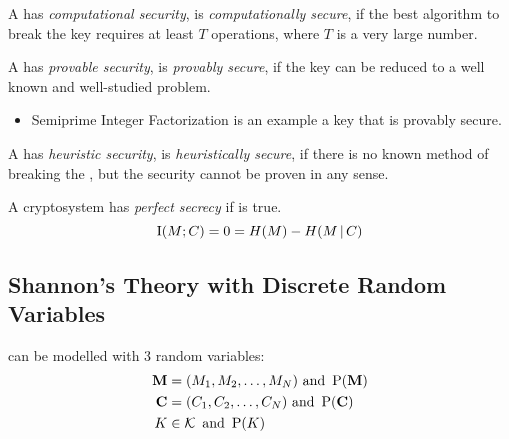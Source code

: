 \begin{definition}\label{def:Security-Computational}
  A  has \emph{computational security}, is \emph{computationally secure}, if the best algorithm to break the key requires at least $T$ operations, where $T$ is a very large number.
\end{definition}

\begin{definition}\label{def:Security-Provable}
  A  has \emph{provable security}, is \emph{provably secure}, if the key can be reduced to a well known and well-studied problem.
  \begin{itemize}[noitemsep]
  \item Semiprime Integer Factorization is an example a key that is provably secure.
  \end{itemize}
\end{definition}

\begin{definition}\label{def:Security-Heuristic}
  A  has \emph{heuristic security}, is \emph{heuristically secure}, if there is no known method of breaking the , but the security cannot be proven in any sense.
\end{definition}

\begin{definition}\label{def:Perfect_Secrecy}
  A cryptosystem has \emph{perfect secrecy} if  is true.
  \begin{equation}\label{eq:Perfect_Secrecy}
    \operatorname{\operatorname{I}}(M;C) = 0 = H(M) - H(M \operatorname{\vert} C)
  \end{equation}
\end{definition}

\subsection{Shannon's Theory with Discrete Random Variables}\label{subsec:Shannon_Theory_Discrete_Random_Variables}
 can be modelled with 3 random variables:
\begin{equation}\label{eq:Shannon_Theory_Discrete_Random_Variables}
  \begin{aligned}
    \mathbf{M} &= (M_{1}, M_{2}, \ldots, M_{N}) \text{ and } \operatorname{\operatorname{P}}(\mathbf{M}) \\
    \mathbf{C} &= (C_{1}, C_{2}, \ldots, C_{N}) \text{ and } \operatorname{\operatorname{P}}(\mathbf{C}) \\
    K &\in \operatorname{\mathcal{K}} \text{ and } \operatorname{\operatorname{P}}(K) \\
  \end{aligned}
\end{equation}

